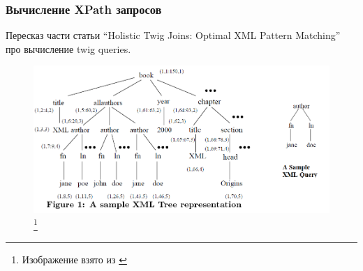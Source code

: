 \documentclass{beamer}
\begin{document}
\begin{frame}
\frametitle{Вычисление XPath запросов}

Пересказ части статьи ``Holistic Twig Joins: Optimal XML Pattern Matching'' \cite{Bruno2002} про вычисление twig queries.

\begin{figure}[htb]
\includegraphics[width=\textwidth,height=0.65\textheight,keepaspectratio]{xmlalg-data.png} 
\footnote{\tiny{Изображение взято из \cite{Bruno2002}}}
\end{figure}    
\end{frame}
\end{document}
